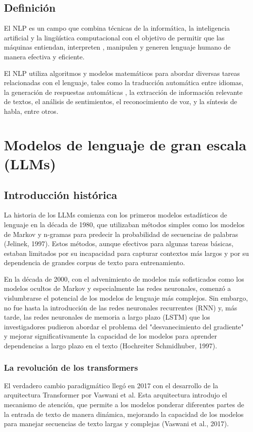 \subsection*{Definición}
El NLP es un campo que combina técnicas de la informática, la inteligencia artificial y la lingüística computacional con
el objetivo de permitir que las máquinas entiendan, interpreten
, manipulen y generen lenguaje humano de manera efectiva y eficiente.

El NLP utiliza algoritmos y modelos matemáticos para abordar diversas tareas relacionadas con el lenguaje, tales como la
traducción automática entre idiomas, la generación de respuestas automáticas
, la extracción de información relevante de textos, el análisis de sentimientos, el reconocimiento de voz, y
la síntesis de habla, entre otros.

\section*{Modelos de lenguaje de gran escala (LLMs)}
\subsection*{Introducción histórica}
La historia de los LLMs comienza con los primeros modelos estadísticos de lenguaje en
la década de 1980, que utilizaban métodos simples como los modelos de Markov y n-gramas para predecir la probabilidad
de secuencias de palabras (Jelinek, 1997). Estos métodos, aunque efectivos para algunas tareas básicas,
estaban limitados por su incapacidad para capturar contextos más largos
y por su dependencia de grandes corpus de texto para entrenamiento.

En la década de 2000, con el advenimiento de modelos más sofisticados como los modelos ocultos de Markov
y especialmente las redes neuronales, comenzó a vislumbrarse el
potencial de los modelos de lenguaje más complejos. Sin embargo, no fue hasta la introducción de las redes neuronales
recurrentes (RNN) y, más tarde, las redes neuronales de memoria a largo plazo (LSTM)
que los investigadores pudieron abordar el problema del "desvanecimiento
del gradiente" y mejorar significativamente la capacidad de los
modelos para aprender dependencias a largo plazo en el texto (Hochreiter Schmidhuber, 1997).

\subsubsection*{La revolución de los transformers}
El verdadero cambio paradigmático llegó en 2017 con el desarrollo de la arquitectura
Transformer por Vaswani et al. Esta arquitectura introdujo el mecanismo
de atención, que permite a los modelos ponderar diferentes partes de la entrada de texto de manera dinámica,
mejorando la capacidad de los modelos para manejar secuencias de texto largas y complejas (Vaswani et al., 2017).


